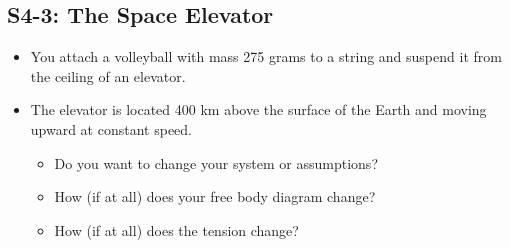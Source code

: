\documentclass[]{article}
\begin{document}
\begin{PresentSpace}
\vspace{-10pt}
\section*{S4-3: The Space Elevator}
\vspace{-10pt}
\begin{itemize}
	\item You attach a volleyball with mass 275 grams to a string and suspend it from the ceiling of an elevator.
	\item The elevator is located 400 km above the surface of the Earth and moving upward at constant speed.
	\begin{itemize}
		\item Do you want to change your system or assumptions?
		\item How (if at all) does your free body diagram change?
		\item How (if at all) does the tension change?
	\end{itemize}
\end{itemize}
\end{PresentSpace}
\newpage
\end{document}
